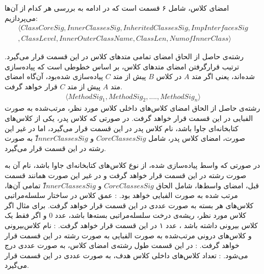 
امضای کلاس، شامل ۶ قسمت است که در ادامه به بررسی هر کدام از آن‌ها می‌پردازیم: 
\begin{equation}
\begin{split}
\langle ClassCoreSig,InnerClassesSig,InheritedClassesSig,ImpInterfacesSig\\
,ClassLevel,InnerOuterClassName,ClassLen,NumofInnerClass \rangle
\end{split}
\end{equation}

 رشته‌ی حاصل از الحاق امضای تمامی متد‌های کلاس در این قسمت قرار می‌گیرد. ترتیب قرار‌گرفتن امضای متد‌های کلاس، بر اساس خطوطی است که پیاده‌سازی شده‌اند، یعنی اگر متد $A$ در کلاس $B$ پیش از متد $C$ پیاده‌سازی شده‌بود، آن‌گاه امضای متد $A$ پیش از متد $C$ قرار خواهد گرفت.
\begin{equation}
\begin{split}
\langle MethodSig_1,MethodSig_2, ...., MethodSig_n \rangle
\end{split}
\end{equation}
 رشته‌ی حاصل از الحاق امضای کلاس‌های داخلی کلاس مورد نظر، مرتب‌شده به صورت الفبایی در این قسمت قرار خواهد گرفت.
 در صورتی که کلاس پدر، یکی از کلاس‌های کتابخانه‌ای جاوا باشد، نام کلاس پدر در این قسمت قرار می‌گیرد، اما در غیر این صورت، امضای کلاس پدر، شامل $CoreClassesSig$ و $ّInnerClassesSig$ به صورت رشته در این قسمت قرار می‌گیرد.

 در صورتی که واسط پیاده‌سازی شده، از نوع کلاس‌های کتابخانه‌ای جاوا باشد، نام آن به صورت رشته در این قسمت قرار خواهد گرفت و در غیر این صورت همانند قسمت قبل، امضای واسط‌ها، شامل الحاق $CoreClassesSig$ و $ّInnerClassesSig$ تمامی آن‌ها، مرتب شده به صورت الفبایی خواهد بود.
: عمق کلاس در ساختار سلسله‌مراتبی کلاس‌های هر بسته به صورت عددی در این قسمت قرار خواهد گرفت. برای مثال اگر کلاس مورد نظر، ریشه‌ی درخت سلسله‌مراتبی بسته‌ها باشد، عدد 0 و اگر فقط یک کلاس بیرونی داشته باشد ، عدد ۱ در این قسمت قرار خواهد گرفت.
: نام کلاس‌بیرونی و کلاس‌های درونی مرتب‌شده به صورت الفبایی به صورت رشته در این قسمت قرار خواهد گرفت.
: در این قسمت  طول رشته‌ی امضای کلاس، به صورت عددی درج می‌شود.
: تعداد کلاس‌های داخلی کلاس هدف، به صورت عددی در این قسمت قرار می‌گیرد.

